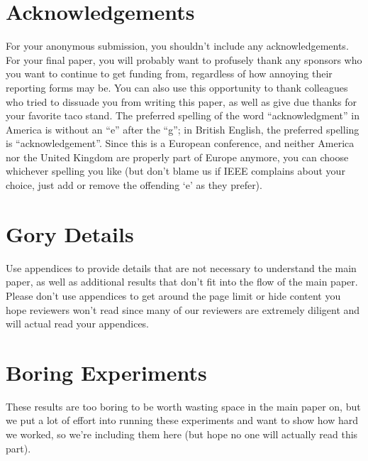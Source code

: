 \documentclass[compsoc, conference, a4paper, 10pt, times]{IEEEtran}
\begin{document}
\section*{Acknowledgements}
For your anonymous submission, you shouldn't include any acknowledgements. For your final paper, you will probably want to profusely thank any sponsors who you want to continue to get funding from, regardless of how annoying their reporting forms may be. You can also use this opportunity to thank colleagues who tried to dissuade you from writing this paper, as well as give due thanks for your favorite taco stand. 
The preferred spelling of the word ``acknowledgment'' in America is without  an ``e'' after the ``g''; in British English, the preferred spelling is ``acknowledgement''. Since this is a European conference, and neither America nor the United Kingdom are properly part of Europe anymore, you can choose whichever spelling you like (but don't blame us if IEEE complains about your choice, just add or remove the offending `e' as they prefer). 




\appendices

\section{Gory Details}

Use appendices to provide details that are not necessary to understand the main paper, as well as additional results that don't fit into the flow of the main paper. Please don't use appendices to get around the page limit or hide content you hope reviewers won't read since many of our reviewers are extremely diligent and will actual read your appendices.

\section{Boring Experiments}

These results are too boring to be worth wasting space in the main paper on, but we put a lot of effort into running these experiments and want to show how hard we worked, so we're including them here (but hope no one will actually read this part).
\end{document}
